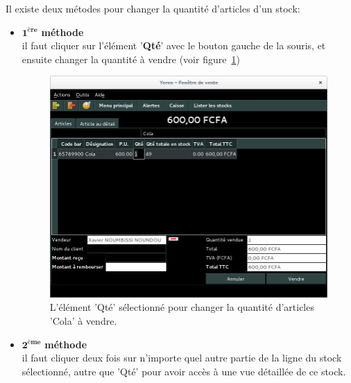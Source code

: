 \newpage
{}\label{sec:changer-qte-vendre}

Il existe deux m\'etodes pour changer la quantit\'e
d'articles d'un stock:
\begin{itemize}[]
	\item \textcolor{purplish}{$\mathbf{1^{\text{\`ere}}}$ \textbf{m\'ethode}}\\
	il faut cliquer sur l'\'el\'ement '\textbf{Qt\'e}'
	avec le bouton gauche de la souris, et ensuite changer la
	quantit\'e \`a vendre (voir figure~\ref{fig:yeren-vendre-qte-selectionner})
	\begin{figure}[!htbp]
		\centering
		\includegraphics[scale=0.63]{images/yeren-vendre-qte-selectionner.png}
		\caption{L'\'el\'ement 'Qt\'e' s\'electionn\'e pour
			changer la quantit\'e d'articles 'Cola' \`a vendre.}\label{fig:yeren-vendre-qte-selectionner}
	\end{figure}
	\newpage
	
	\item \textcolor{purplish}{$\mathbf{2^{\text{\`eme}}}$ \textbf{m\'ethode}}\\
	il faut cliquer deux fois sur n'importe quel autre
	partie de la ligne du stock s\'electionn\'e, autre que 'Qt\'e'
	pour avoir acc\`es \`a une vue d\'etaill\'ee de ce stock.\\
	

\end{itemize}
